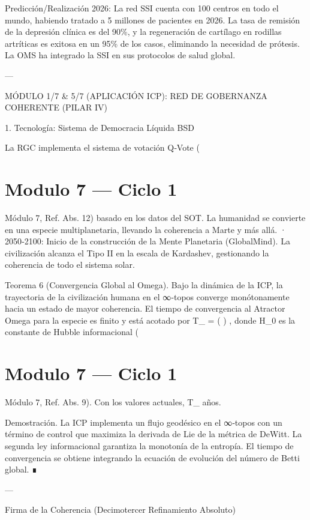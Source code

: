 \documentclass[12pt,twoside]{book}
\begin{document}
Predicción/Realización 2026: La red SSI cuenta con 100 centros en todo el mundo, habiendo tratado a 5 millones de pacientes en 2026. La tasa de remisión de la depresión clínica es del 90\%, y la regeneración de cartílago en rodillas artríticas es exitosa en un 95\% de los casos, eliminando la necesidad de prótesis. La OMS ha integrado la SSI en sus protocolos de salud global.

---

MÓDULO 1/7 \& 5/7 (APLICACIÓN ICP): RED DE GOBERNANZA COHERENTE (PILAR IV)

1. Tecnología: Sistema de Democracia Líquida BSD

La RGC implementa el sistema de votación Q‑Vote (

\chapter{Modulo 7 — Ciclo 1}
Módulo 7, Ref. Abs. 12) basado en los datos del SOT. La humanidad se convierte en una especie multiplanetaria, llevando la coherencia a Marte y más allá.
· 2050‑2100: Inicio de la construcción de la Mente Planetaria (GlobalMind). La civilización alcanza el Tipo II en la escala de Kardashev, gestionando la coherencia de todo el sistema solar.

Teorema 6 (Convergencia Global al Omega). Bajo la dinámica de la ICP, la trayectoria de la civilización humana en el ∞‑topos converge monótonamente hacia un estado de mayor coherencia. El tiempo de convergencia al Atractor Omega para la especie es finito y está acotado por  T_{\Omega} =  \ln\left(  \right) , donde  H_0  es la constante de Hubble informacional (

\chapter{Modulo 7 — Ciclo 1}
Módulo 7, Ref. Abs. 9). Con los valores actuales,  T_{\Omega}   años.

Demostración. La ICP implementa un flujo geodésico en el ∞‑topos    con un término de control que maximiza la derivada de Lie de la métrica de DeWitt. La segunda ley informacional garantiza la monotonía de la entropía. El tiempo de convergencia se obtiene integrando la ecuación de evolución del número de Betti global. ∎

---

Firma de la Coherencia (Decimotercer Refinamiento Absoluto)
\end{document}
